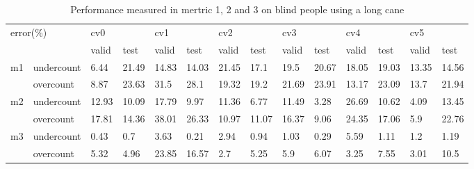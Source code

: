 \documentclass[11pt]{article}
\begin{document}
\begin{table}[]
\centering
\caption{Performance measured in mertric 1, 2 and 3 on blind people using a long cane}
\label{my-label}
\hspace*{-1.5cm}
\begin{tabular}{|l|l|l|l|l|l|l|l|l|l|l|l|l|l|}
\hline
\multicolumn{2}{|l|}{\multirow{2}{*}{error(\%)}} & \multicolumn{2}{l|}{cv0} & \multicolumn{2}{l|}{cv1} & \multicolumn{2}{l|}{cv2} & \multicolumn{2}{l|}{cv3} & \multicolumn{2}{l|}{cv4} & \multicolumn{2}{l|}{cv5} \\ \cline{3-14} 
\multicolumn{2}{|l|}{}                           & valid       & test       & valid       & test       & valid       & test       & valid       & test       & valid       & test       & valid       & test       \\ \hline
\multirow{2}{*}{m1}       & undercount      & 6.44        & 21.49      & 14.83       & 14.03      & 21.45       & 17.1       & 19.5        & 20.67      & 18.05       & 19.03      & 13.35       & 14.56      \\ \cline{2-14} 
                               & overcount       & 8.87        & 23.63      & 31.5        & 28.1       & 19.32       & 19.2       & 21.69       & 23.91      & 13.17       & 23.09      & 13.7        & 21.94      \\ \hline
\multirow{2}{*}{m2}       & undercount      & 12.93       & 10.09      & 17.79       & 9.97       & 11.36       & 6.77       & 11.49       & 3.28       & 26.69       & 10.62      & 4.09        & 13.45      \\ \cline{2-14} 
                               & overcount       & 17.81       & 14.36      & 38.01       & 26.33      & 10.97       & 11.07      & 16.37       & 9.06       & 24.35       & 17.06      & 5.9         & 22.76      \\ \hline
\multirow{2}{*}{m3}       & undercount      & 0.43        & 0.7        & 3.63        & 0.21       & 2.94        & 0.94       & 1.03        & 0.29       & 5.59        & 1.11       & 1.2         & 1.19       \\ \cline{2-14} 
                               & overcount       & 5.32        & 4.96       & 23.85       & 16.57      & 2.7         & 5.25       & 5.9         & 6.07       & 3.25        & 7.55       & 3.01        & 10.5       \\ \hline
\end{tabular}
\end{table}


\nocite{*}


%


\end{document}
